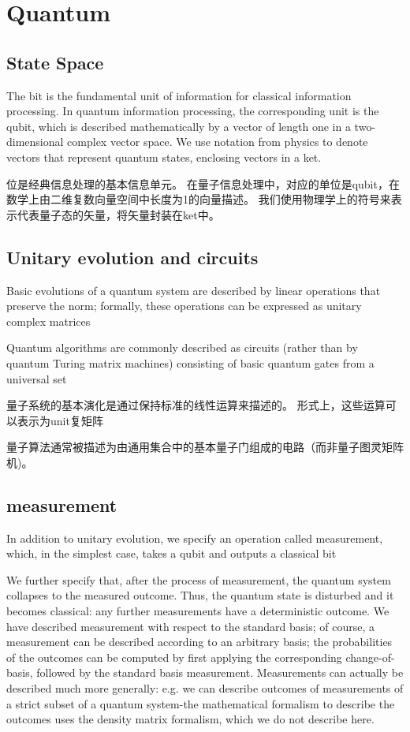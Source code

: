 \chapter{Quantum}
\label{chap:Quantum}

\section{State Space}
The bit is the fundamental unit of information for classical information processing. In quantum information processing, the corresponding unit is the qubit, which is described mathematically by a vector of length one in a two-dimensional complex vector space. We use notation from physics to denote vectors that represent quantum states, enclosing vectors in a ket.

位是经典信息处理的基本信息单元。 在量子信息处理中，对应的单位是qubit，在数学上由二维复数向量空间中长度为1的向量描述。 我们使用物理学上的符号来表示代表量子态的矢量，将矢量封装在ket中。

\section{Unitary evolution and circuits}
Basic evolutions of a quantum system are described by linear operations that preserve the norm; formally, these operations can be expressed as unitary complex matrices

Quantum algorithms are commonly described as circuits (rather than by quantum Turing matrix machines) consisting of basic quantum gates from a universal set

量子系统的基本演化是通过保持标准的线性运算来描述的。 形式上，这些运算可以表示为unit复矩阵

量子算法通常被描述为由通用集合中的基本量子门组成的电路（而非量子图灵矩阵机)。

\section{measurement}
In addition to unitary evolution, we specify an operation called measurement, which, in the simplest case, takes a qubit and outputs a classical bit

We further specify that, after the process of measurement, the quantum system collapses to the measured outcome. Thus, the quantum state is disturbed and it becomes classical: any further measurements have a deterministic outcome. We have described measurement with respect to the standard basis; of course, a measurement can be described according to an arbitrary basis; the probabilities of the outcomes can be computed by first applying the corresponding change-of-basis, followed by the standard basis measurement. Measurements can actually be described much more generally: e.g. we can describe outcomes of measurements of a strict subset of a quantum system-the mathematical formalism to describe the outcomes uses the density matrix formalism, which we do not describe here.

